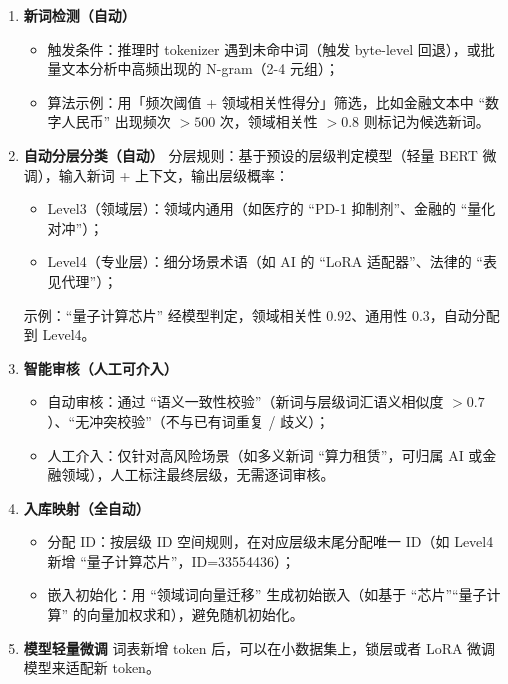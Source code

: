 \documentclass[11pt, a4paper]{article}
\begin{document}
\begin{enumerate}
    \item \textbf{新词检测（自动）}
    \begin{itemize}
        \item 触发条件：推理时 tokenizer 遇到未命中词（触发 byte-level 回退），或批量文本分析中高频出现的 N-gram（2-4 元组）；
        \item 算法示例：用「频次阈值 + 领域相关性得分」筛选，比如金融文本中 “数字人民币” 出现频次 $>500$ 次，领域相关性 $>0.8$ 则标记为候选新词。
    \end{itemize}
    
    \item \textbf{自动分层分类（自动）}
    分层规则：基于预设的层级判定模型（轻量 BERT 微调），输入新词 + 上下文，输出层级概率：
    \begin{itemize}
        \item Level3（领域层）：领域内通用（如医疗的 “PD-1 抑制剂”、金融的 “量化对冲”）；
        \item Level4（专业层）：细分场景术语（如 AI 的 “LoRA 适配器”、法律的 “表见代理”）；
    \end{itemize}
    示例：“量子计算芯片” 经模型判定，领域相关性 0.92、通用性 0.3，自动分配到 Level4。

    \item \textbf{智能审核（人工可介入）}
    \begin{itemize}
        \item 自动审核：通过 “语义一致性校验”（新词与层级词汇语义相似度 $>0.7$）、“无冲突校验”（不与已有词重复 / 歧义）；
        \item 人工介入：仅针对高风险场景（如多义新词 “算力租赁”，可归属 AI 或金融领域），人工标注最终层级，无需逐词审核。
    \end{itemize}

    \item \textbf{入库映射（全自动）}
    \begin{itemize}
        \item 分配 ID：按层级 ID 空间规则，在对应层级末尾分配唯一 ID（如 Level4 新增 “量子计算芯片”，ID=33554436）；
        \item 嵌入初始化：用 “领域词向量迁移” 生成初始嵌入（如基于 “芯片”“量子计算” 的向量加权求和），避免随机初始化。
    \end{itemize}
    
    \item \textbf{模型轻量微调}
    词表新增 token 后，可以在小数据集上，锁层或者 LoRA 微调模型来适配新 token。
\end{enumerate}
\end{document}
